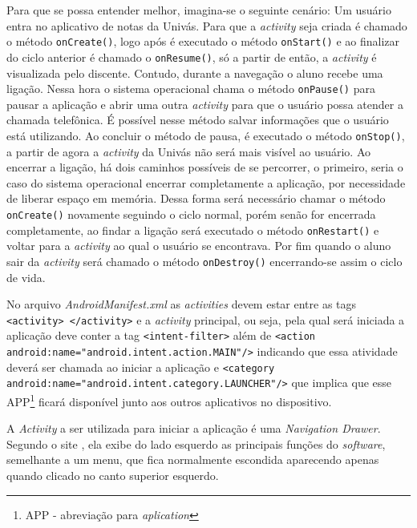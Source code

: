 	\par Para que se possa entender melhor, imagina-se o seguinte cenário: Um
usuário entra no aplicativo de notas da Univás. Para que a \textit{activity}
seja criada é chamado o método \texttt{onCreate()}, logo após é executado o
método \texttt{onStart()} e ao finalizar do ciclo anterior é chamado o
\texttt{onResume()}, só a partir de então, a \textit{activity} é visualizada
pelo discente. Contudo, durante a navegação o aluno recebe uma ligação. Nessa
hora o sistema operacional chama o método \texttt{onPause()} para pausar a
aplicação e abrir uma outra \textit{activity} para que o usuário possa atender
a chamada telefônica. É possível nesse método salvar informações que o
usuário está utilizando. Ao concluir o método de pausa, é executado o método
\texttt{onStop()}, a partir de agora a \textit{activity} da Univás não será
mais visível ao usuário. Ao encerrar a ligação, há dois caminhos possíveis de
se percorrer, o primeiro, seria o caso do sistema operacional encerrar
completamente a aplicação, por necessidade de liberar espaço em memória. Dessa
forma será necessário chamar o método \texttt{onCreate()} novamente seguindo o
ciclo normal, porém senão for encerrada completamente, ao findar a ligação será
executado o método \texttt{onRestart()} e voltar para a \textit{activity} ao
qual o usuário se encontrava. Por fim quando o aluno sair da \textit{activity}
será chamado o método \texttt{onDestroy()} encerrando-se assim o ciclo de vida.

	\par No arquivo \textit{AndroidManifest.xml} as \textit{activities} devem estar
entre as tags \texttt{<activity> </activity>} e a \textit{activity} principal,
ou seja, pela qual será iniciada a aplicação deve conter a tag
\texttt{<intent-filter>} além de \small{\texttt{<action
android:name="android.intent.action.MAIN"/>}} indicando que essa atividade
deverá ser chamada ao iniciar a aplicação e \small{\texttt{<category
android:name="android.intent.category.LAUNCHER"/>}} que implica que esse
APP\footnote{APP - abreviação para \textit{aplication}} ficará disponível junto
aos outros aplicativos no dispositivo.

	\par A \textit{Activity} a ser utilizada para iniciar a aplicação é uma
\textit{Navigation Drawer}. Segundo o site , ela exibe
do lado esquerdo as principais funções do \textit{software}, semelhante a um
menu, que fica normalmente escondida aparecendo apenas quando clicado no canto
superior esquerdo.

